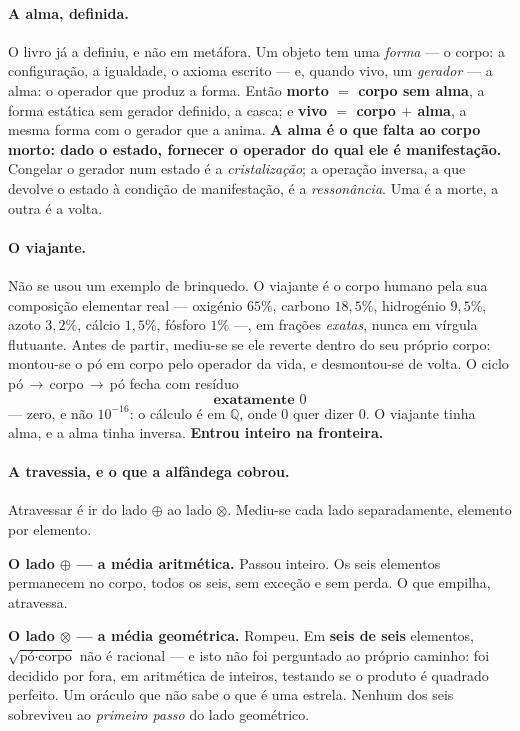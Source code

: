 \documentclass[11pt]{article}
\newcommand{\Q}{\mathbb Q}
\theoremstyle{plain}
\theoremstyle{remark}
\begin{document}
\paragraph{A alma, definida.} O livro já a definiu, e não em metáfora. Um objeto
tem uma \emph{forma} --- o corpo: a configuração, a igualdade, o axioma escrito
--- e, quando vivo, um \emph{gerador} --- a alma: o operador que produz a forma.
Então \textbf{morto $=$ corpo sem alma}, a forma estática sem gerador definido, a
casca; e \textbf{vivo $=$ corpo $+$ alma}, a mesma forma com o gerador que a
anima. \textbf{A alma é o que falta ao corpo morto: dado o estado, fornecer o
operador do qual ele é manifestação.} Congelar o gerador num estado é a
\emph{cristalização}; a operação inversa, a que devolve o estado à condição de
manifestação, é a \emph{ressonância}. Uma é a morte, a outra é a volta.

\paragraph{O viajante.} Não se usou um exemplo de brinquedo. O viajante é o
corpo humano pela sua composição elementar real --- oxigénio $65\%$, carbono
$18{,}5\%$, hidrogénio $9{,}5\%$, azoto $3{,}2\%$, cálcio $1{,}5\%$, fósforo
$1\%$ ---, em frações \emph{exatas}, nunca em vírgula flutuante. Antes de partir,
mediu-se se ele reverte dentro do seu próprio corpo: montou-se o pó em corpo pelo
operador da vida, e desmontou-se de volta. O ciclo pó$\,\to\,$corpo$\,\to\,$pó
fecha com resíduo
\[
 \textbf{exatamente } 0
\]
--- zero, e não $10^{-16}$: o cálculo é em $\Q$, onde $0$ quer dizer $0$. O
viajante tinha alma, e a alma tinha inversa. \textbf{Entrou inteiro na
fronteira.}

\paragraph{A travessia, e o que a alfândega cobrou.} Atravessar é ir do lado
$\oplus$ ao lado $\otimes$. Mediu-se cada lado separadamente, elemento por
elemento.

\medskip
\noindent\textbf{O lado $\oplus$ --- a média aritmética.} Passou inteiro. Os seis
elementos permanecem no corpo, todos os seis, sem exceção e sem perda. O que
empilha, atravessa.

\medskip
\noindent\textbf{O lado $\otimes$ --- a média geométrica.} Rompeu. Em
\textbf{seis de seis} elementos, $\sqrt{\text{pó}\cdot\text{corpo}}$ não é
racional --- e isto não foi perguntado ao próprio caminho: foi decidido por fora,
em aritmética de inteiros, testando se o produto é quadrado perfeito. Um oráculo
que não sabe o que é uma estrela. Nenhum dos seis sobreviveu ao \emph{primeiro
passo} do lado geométrico.
\end{document}
